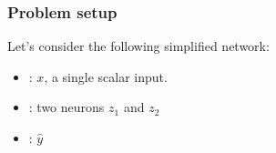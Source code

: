 \documentclass[letterpaper,10pt,english]{jupyterBook}
\begin{document}
\subsubsection{Problem setup}
\label{\detokenize{04:problem-setup}}
\sphinxAtStartPar
Let’s consider the following simplified network:
\begin{itemize}
\item {} 
\sphinxAtStartPar
{}: \(x\), a single scalar input.

\item {} 
\sphinxAtStartPar
{}: two neurons \(z_1\) and \(z_2\)

\item {} 
\sphinxAtStartPar
{}: \(\hat{y}\)

\end{itemize}
\end{document}

